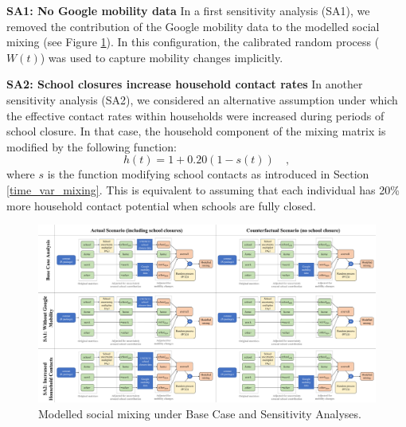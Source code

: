\vspace{5pt}
\label{sa_descriptions}
\textbf{SA1: No Google mobility data}
In a first sensitivity analysis (SA1), we removed the contribution of the Google mobility data to the modelled social mixing (see Figure \ref{fig:mixing}). 
In this configuration, the calibrated random process ($W(t)$) was used to capture mobility changes implicitly.

\vspace{5pt}
\textbf{SA2: School closures increase household contact rates}
In another sensitivity analysis (SA2), we considered an alternative assumption under which the effective contact rates within households were increased during
periods of school closure. In that case, the household component of the mixing matrix is modified by the following function:
$$ h(t) = 1 + 0.20(1 - s(t)) \quad ,$$ 
where $s$ is the function modifying school contacts as introduced in Section \ref{time_var_mixing}. This is equivalent to assuming
that each individual has 20\% more household contact potential when schools are fully closed.


\begin{figure}[h]
  \begin{center}
  \includegraphics[width=1.0\textwidth]{../../tex_descriptions/projects/sm_covid/mixing_multi.pdf}
  \end{center}
  \caption{Modelled social mixing under Base Case and Sensitivity Analyses.
  } 
  \label{fig:mixing}
\end{figure}